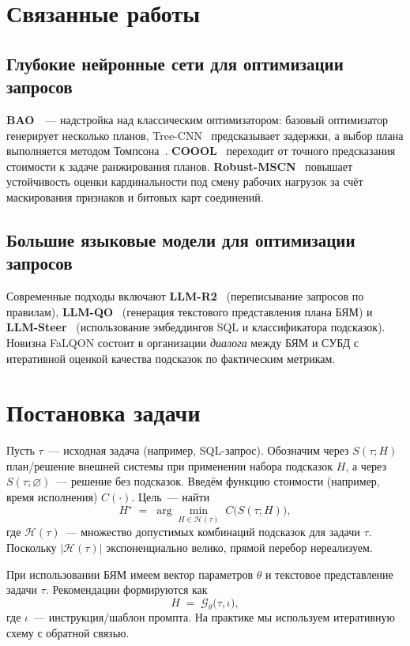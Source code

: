\section{Связанные работы}
\subsection{Глубокие нейронные сети для оптимизации запросов}
\textbf{BAO}~\cite{marcus2022bao}~— надстройка над классическим оптимизатором: базовый оптимизатор генерирует несколько планов, Tree-CNN~\cite{roy2019treecnn} предсказывает задержки, а выбор плана выполняется методом Томпсона~\cite{thompson1933}. \textbf{COOOL}~\cite{xu2023coool} переходит от точного предсказания стоимости к задаче ранжирования планов. \textbf{Robust-MSCN}~\cite{negi2023robust} повышает устойчивость оценки кардинальности под смену рабочих нагрузок за счёт маскирования признаков и битовых карт соединений.

\subsection{Большие языковые модели для оптимизации запросов}
Современные подходы включают \textbf{LLM-R2}~\cite{li2024llmr2} (переписывание запросов по правилам), \textbf{LLM-QO}~\cite{tan2025can} (генерация текстового представления плана БЯМ) и \textbf{LLM-Steer}~\cite{akioyamen2024unreasonable} (использование эмбеддингов SQL и классификатора подсказок). Новизна FaLQON состоит в организации \emph{диалога} между БЯМ и СУБД с итеративной оценкой качества подсказок по фактическим метрикам.

\section{Постановка задачи}
Пусть $\tau$~— исходная задача (например, SQL-запрос). Обозначим через $S(\tau; H)$ план/решение внешней системы при применении набора подсказок $H$, а через $S(\tau;\varnothing)$~— решение без подсказок. Введём функцию стоимости (например, время исполнения) $C(\cdot)$. Цель~— найти
\begin{equation}
  H^\star \;=\; \arg\min_{H \in \mathcal{H}(\tau)} \; C\!\bigl(S(\tau; H)\bigr),
  \label{eq:goal}
\end{equation}
где $\mathcal{H}(\tau)$~— множество допустимых комбинаций подсказок для задачи $\tau$. Поскольку $|\mathcal{H}(\tau)|$ экспоненциально велико, прямой перебор нереализуем.

При использовании БЯМ имеем вектор параметров $\theta$ и текстовое представление задачи $\tau$. Рекомендации формируются как
\begin{equation}
  H \;=\; \mathcal{G}_\theta\!\bigl(\tau, \iota\bigr),
  \label{eq:llm_one_shot}
\end{equation}
где $\iota$~— инструкция/шаблон промпта. На практике мы используем итеративную схему с обратной связью.

